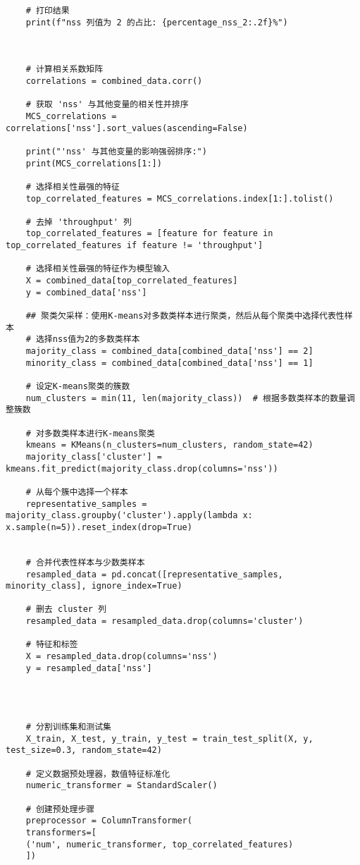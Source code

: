 \documentclass[bwprint,fontset=windows]{gmcmthesis}
\begin{document}
\begin{lstlisting}
	# 打印结果
	print(f"nss 列值为 2 的占比: {percentage_nss_2:.2f}%")
	
	
	
	# 计算相关系数矩阵
	correlations = combined_data.corr()
	
	# 获取 'nss' 与其他变量的相关性并排序
	MCS_correlations = correlations['nss'].sort_values(ascending=False)
	
	print("'nss' 与其他变量的影响强弱排序:")
	print(MCS_correlations[1:])
	
	# 选择相关性最强的特征
	top_correlated_features = MCS_correlations.index[1:].tolist()
	
	# 去掉 'throughput' 列
	top_correlated_features = [feature for feature in top_correlated_features if feature != 'throughput']
	
	# 选择相关性最强的特征作为模型输入
	X = combined_data[top_correlated_features]
	y = combined_data['nss']
	
	## 聚类欠采样：使用K-means对多数类样本进行聚类，然后从每个聚类中选择代表性样本
	# 选择nss值为2的多数类样本
	majority_class = combined_data[combined_data['nss'] == 2]
	minority_class = combined_data[combined_data['nss'] == 1]
	
	# 设定K-means聚类的簇数
	num_clusters = min(11, len(majority_class))  # 根据多数类样本的数量调整簇数
	
	# 对多数类样本进行K-means聚类
	kmeans = KMeans(n_clusters=num_clusters, random_state=42)
	majority_class['cluster'] = kmeans.fit_predict(majority_class.drop(columns='nss'))
	
	# 从每个簇中选择一个样本
	representative_samples = majority_class.groupby('cluster').apply(lambda x: x.sample(n=5)).reset_index(drop=True)
	
	
	# 合并代表性样本与少数类样本
	resampled_data = pd.concat([representative_samples, minority_class], ignore_index=True)
	
	# 删去 cluster 列
	resampled_data = resampled_data.drop(columns='cluster')
	
	# 特征和标签
	X = resampled_data.drop(columns='nss')
	y = resampled_data['nss']
	
	
	
	
	# 分割训练集和测试集
	X_train, X_test, y_train, y_test = train_test_split(X, y, test_size=0.3, random_state=42)
	
	# 定义数据预处理器，数值特征标准化
	numeric_transformer = StandardScaler()
	
	# 创建预处理步骤
	preprocessor = ColumnTransformer(
	transformers=[
	('num', numeric_transformer, top_correlated_features)
	])
	

\end{lstlisting}
\end{document}
